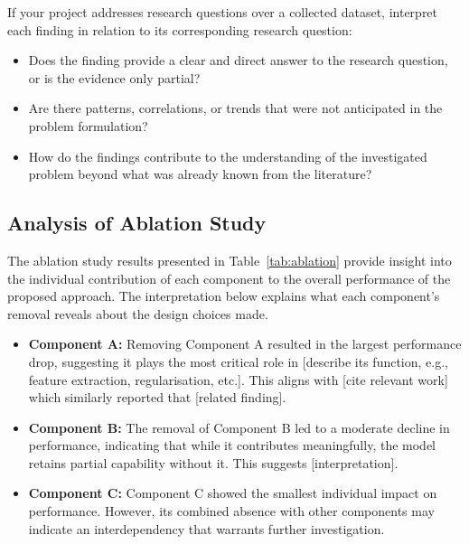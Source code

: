 If your project addresses research questions over a collected dataset, interpret
each finding in relation to its corresponding research question:
\begin{itemize}
    \item Does the finding provide a clear and direct answer to the research
    question, or is the evidence only partial?
    \item Are there patterns, correlations, or trends that were not anticipated
    in the problem formulation?
    \item How do the findings contribute to the understanding of the investigated
    problem beyond what was already known from the literature?
\end{itemize}

\subsection{Analysis of Ablation Study}
\label{subsec:ablation-analysis}

The ablation study results presented in Table~\ref{tab:ablation} provide insight 
into the individual contribution of each component to the overall performance 
of the proposed approach. The interpretation below explains what each component's 
removal reveals about the design choices made.

\begin{itemize}
    \item \textbf{Component A:} Removing Component A resulted in the largest
    performance drop, suggesting it plays the most critical role in [describe
    its function, e.g., feature extraction, regularisation, etc.]. This aligns
    with [cite relevant work] which similarly reported that [related finding].

    \item \textbf{Component B:} The removal of Component B led to a moderate
    decline in performance, indicating that while it contributes meaningfully,
    the model retains partial capability without it. This suggests [interpretation].

    \item \textbf{Component C:} Component C showed the smallest individual
    impact on performance. However, its combined absence with other components
    may indicate an interdependency that warrants further investigation.
\end{itemize}

